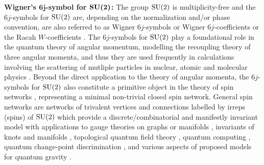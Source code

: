 \documentclass[notitlepage, 10pt]{article}
\begin{document}
\vspace{1em}
\textbf{Wigner's $\boldsymbol{6j}$-symbol for $\boldsymbol{\operatorname{SU}(2)}$:}
The group $\operatorname{SU}(2)$ is multiplicity-free and the $6j$-symbols for $\operatorname{SU}(2)$ are, depending on the normalization and/or phase convention, are also referred to as Wigner $6j$-symbols or Wigner $6j$-coefficients \cite{wigner1993matrices} or the Racah $W$-coefficients \cite{racah1942theory}.
The $6j$-symbols for $\operatorname{SU}(2)$ play a foundational role in the quantum theory of angular momentum, modelling the recoupling theory of three angular momenta, and thus they are used frequently in calculations involving the scattering of mutliple particles in nuclear, atomic and molecular physics \cite{varshalovich1988quantum,edmonds1996angular,aquilanti2012semiclassical}.
Beyond the direct application to the theory of angular momenta, the $6j$-symbols for $\operatorname{SU}(2)$ also constitute a primitive object in the theory of spin networks \cite{penrose1971applications, baez2010physics}, representing a minimal non-trivial closed spin network.
General spin networks are networks of trivalent vertices and connections labelled by irreps (spins) of $\operatorname{SU}(2)$ which provide a discrete/combinatorial and manifestly invariant model with applications to gauge theories on graphs or manifolds \cite{baez1996spin}, invariants of knots and manifolds \cite{reshetikhin1987quantized, turaev1992state}, topological quantum field theory \cite{durhuus1993topological}, quantum computing \cite{marzuoli2005computing}, quantum change-point discrimination \cite{akimoto2011discrimination}, and various aspects of proposed models for quantum gravity \cite{baez1999introduction,barrett1998relativistic,barrett2003geometrical,rovelli2004quantum}.
\end{document}
